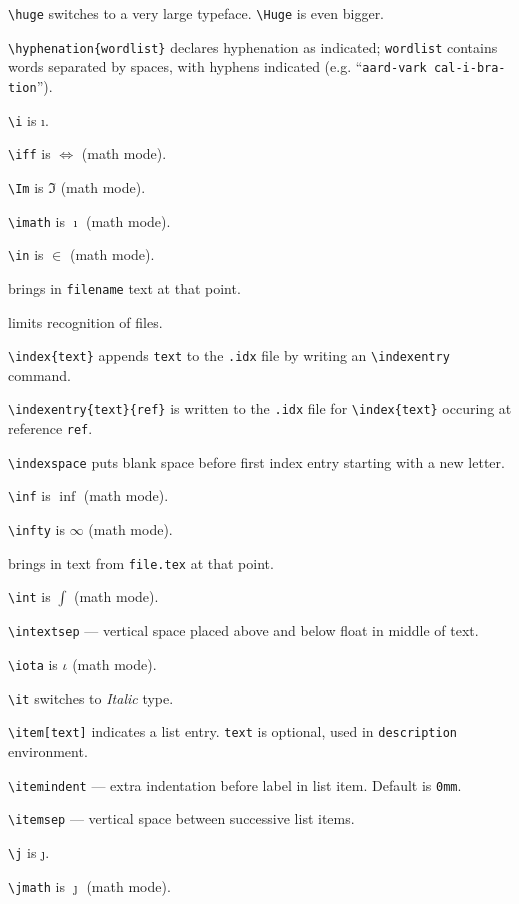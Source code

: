 \verb"\huge" switches to a very large typeface.
	\verb"\Huge" is even bigger.

\verb"\hyphenation{wordlist}" declares hyphenation as indicated;
	\verb"wordlist" contains words separated by spaces, with hyphens
	indicated (e.g. ``\verb"aard-vark cal-i-bra-tion"'').

\verb"\i" is \i.

\verb"\iff" is $\iff$ (math mode).

\verb"\Im" is $\Im$ (math mode).

\verb"\imath" is $\imath$ (math mode).

\verb"\in" is $\in$ (math mode).

\verb"" brings in \verb"filename" text at that point.

\verb"" limits recognition of \verb""
	files.

\verb"\index{text}" appends \verb"text" to the \verb".idx" file
	by writing an \verb"\indexentry" command.
	
\verb"\indexentry{text}{ref}" is written to the \verb".idx" file for
	\verb"\index{text}" occuring at reference \verb"ref".

\verb"\indexspace" puts blank space before first index entry starting with
	a new letter.

\verb"\inf" is $\inf$ (math mode).

\verb"\infty" is $\infty$ (math mode).

\verb"" brings in text from \verb"file.tex" at that point.

\verb"\int" is $\int$ (math mode).

\verb"\intextsep" --- vertical space placed above and below float in middle
	of text.

\verb"\iota" is $\iota$ (math mode).

\verb"\it" switches to {\it Italic\/} type.

\verb"\item[text]" indicates a list entry.  \verb"text" is optional, used in
	\verb"description" environment.

\verb"\itemindent" --- extra indentation before label in list item.  Default
	is \verb"0mm".

\verb"\itemsep" --- vertical space between successive list items.

\verb"\j" is \j.

\verb"\jmath" is $\jmath$ (math mode).

